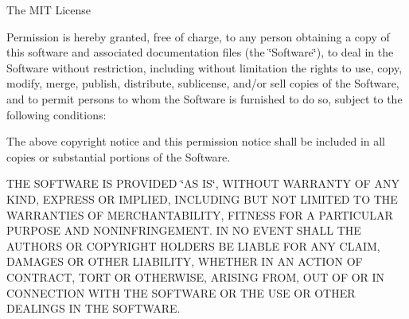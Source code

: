 The M\+IT License

Permission is hereby granted, free of charge, to any person obtaining a copy of this software and associated documentation files (the \char`\"{}\+Software\char`\"{}), to deal in the Software without restriction, including without limitation the rights to use, copy, modify, merge, publish, distribute, sublicense, and/or sell copies of the Software, and to permit persons to whom the Software is furnished to do so, subject to the following conditions\+:

The above copyright notice and this permission notice shall be included in all copies or substantial portions of the Software.

T\+HE S\+O\+F\+T\+W\+A\+RE IS P\+R\+O\+V\+I\+D\+ED \char`\"{}\+A\+S I\+S\char`\"{}, W\+I\+T\+H\+O\+UT W\+A\+R\+R\+A\+N\+TY OF A\+NY K\+I\+ND, E\+X\+P\+R\+E\+SS OR I\+M\+P\+L\+I\+ED, I\+N\+C\+L\+U\+D\+I\+NG B\+UT N\+OT L\+I\+M\+I\+T\+ED TO T\+HE W\+A\+R\+R\+A\+N\+T\+I\+ES OF M\+E\+R\+C\+H\+A\+N\+T\+A\+B\+I\+L\+I\+TY, F\+I\+T\+N\+E\+SS F\+OR A P\+A\+R\+T\+I\+C\+U\+L\+AR P\+U\+R\+P\+O\+SE A\+ND N\+O\+N\+I\+N\+F\+R\+I\+N\+G\+E\+M\+E\+NT. IN NO E\+V\+E\+NT S\+H\+A\+LL T\+HE A\+U\+T\+H\+O\+RS OR C\+O\+P\+Y\+R\+I\+G\+HT H\+O\+L\+D\+E\+RS BE L\+I\+A\+B\+LE F\+OR A\+NY C\+L\+A\+IM, D\+A\+M\+A\+G\+ES OR O\+T\+H\+ER L\+I\+A\+B\+I\+L\+I\+TY, W\+H\+E\+T\+H\+ER IN AN A\+C\+T\+I\+ON OF C\+O\+N\+T\+R\+A\+CT, T\+O\+RT OR O\+T\+H\+E\+R\+W\+I\+SE, A\+R\+I\+S\+I\+NG F\+R\+OM, O\+UT OF OR IN C\+O\+N\+N\+E\+C\+T\+I\+ON W\+I\+TH T\+HE S\+O\+F\+T\+W\+A\+RE OR T\+HE U\+SE OR O\+T\+H\+ER D\+E\+A\+L\+I\+N\+GS IN T\+HE S\+O\+F\+T\+W\+A\+RE. 